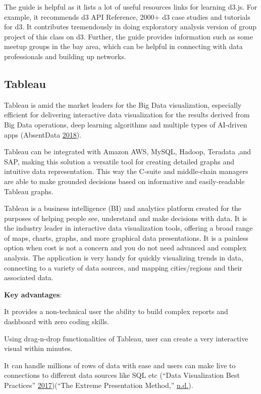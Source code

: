 \documentclass[]{book}
\begin{document}
The guide is helpful as it lists a lot of useful resources links for learning d3.js. For example, it recommends d3 API Reference, 2000+ d3 case studies and tutorials for d3. It contributes tremendously in doing exploratory analysis version of group project of this class on d3. Further, the guide provides information such as some meetup groups in the bay area, which can be helpful in connecting with data professionals and building up networks.

\hypertarget{tableau}{%
\subsection{Tableau}\label{tableau}}

Tableau is amid the market leaders for the Big Data visualization, especially efficient for delivering interactive data visualization for the results derived from Big Data operations, deep learning algorithms and multiple types of AI-driven apps (AbsentData \protect\hyperlink{ref-tableau_interactive_viz}{2018}).

Tableau can be integrated with Amazon AWS, MySQL, Hadoop, Teradata ,and SAP, making this solution a versatile tool for creating detailed graphs and intuitive data representation. This way the C-suite and middle-chain managers are able to make grounded decisions based on informative and easily-readable Tableau graphs.

Tableau is a business intelligence (BI) and analytics platform created for the purposes of helping people see, understand and make decisions with data. It is the industry leader in interactive data visualization tools, offering a broad range of maps, charts, graphs, and more graphical data presentations. It is a painless option when cost is not a concern and you do not need advanced and complex analysis. The application is very handy for quickly visualizing trends in data, connecting to a variety of data sources, and mapping cities/regions and their associated data.

\textbf{Key advantages}:

It provides a non-technical user the ability to build complex reports and dashboard with zero coding skills.

Using drag-n-drop functionalities of Tableau, user can create a very interactive visual within minutes.

It can handle millions of rows of data with ease and users can make live to connections to different data sources like SQL etc (``Data Visualization Best Practices'' \protect\hyperlink{ref-VizBP}{2017})(``The Extreme Presentation Method,'' \protect\hyperlink{ref-extremepre}{n.d.}).
\end{document}
